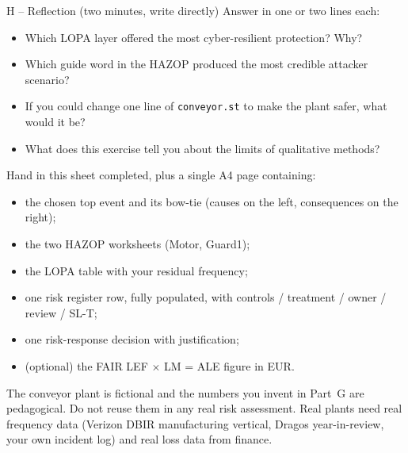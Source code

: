 \documentclass[11pt,a4paper]{article}
\begin{document}
\begin{stepbox}{H -- Reflection (two minutes, write directly)}
Answer in one or two lines each:
\begin{itemize}\setlength{\itemsep}{1pt}
  \item Which LOPA layer offered the most cyber-resilient protection? Why?
  \item Which guide word in the HAZOP produced the most credible attacker scenario?
  \item If you could change one line of \texttt{conveyor.st} to make the plant safer, what would it be?
  \item What does this exercise tell you about the limits of qualitative methods?
\end{itemize}
\end{stepbox}

\begin{deliverbox}
Hand in this sheet completed, plus a single A4 page containing:
\begin{itemize}\setlength{\itemsep}{1pt}
  \item the chosen top event and its bow-tie (causes on the left, consequences on the right);
  \item the two HAZOP worksheets (Motor, Guard1);
  \item the LOPA table with your residual frequency;
  \item one risk register row, fully populated, with controls / treatment / owner / review / SL-T;
  \item one risk-response decision with justification;
  \item (optional) the FAIR LEF $\times$ LM = ALE figure in EUR.
\end{itemize}
\end{deliverbox}

\begin{warnbox}
The conveyor plant is fictional and the numbers you invent in Part~G are pedagogical. Do not reuse them in any real risk assessment. Real plants need real frequency data (Verizon DBIR manufacturing vertical, Dragos year-in-review, your own incident log) and real loss data from finance.
\end{warnbox}
\end{document}
